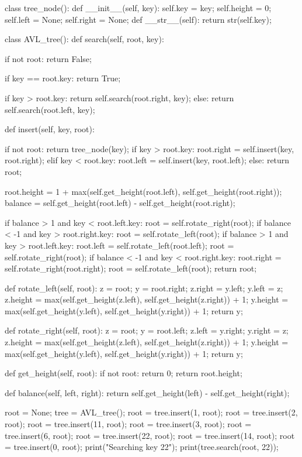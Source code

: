 \begin{python}
class tree_node():
	def __init__(self, key):
		self.key = key;
		self.height = 0;
		self.left = None;
		self.right = None;
	def __str__(self):
		return str(self.key);

class AVL_tree():
	def search(self, root, key):
		

		if not root:
			return False;

		if key == root.key:
			return True;

		if key > root.key:
			return self.search(root.right, key);
		else:
			return self.search(root.left, key);

	def insert(self, key, root):
		
		if not root:
			return tree_node(key);
		if key > root.key:
			root.right = self.insert(key, root.right);
		elif key < root.key:
			root.left = self.insert(key, root.left);
		else:
			return root;

		root.height = 1 + max(self.get_height(root.left), self.get_height(root.right));
		balance = self.get_height(root.left) - self.get_height(root.right);

		if balance > 1 and key < root.left.key:
			root = self.rotate_right(root);
		if balance < -1 and key > root.right.key:
			root = self.rotate_left(root);
		if balance > 1 and key > root.left.key:
			root.left = self.rotate_left(root.left);
			root = self.rotate_right(root);
		if balance < -1 and key < root.right.key:
			root.right = self.rotate_right(root.right);
			root = self.rotate_left(root);
		return root;

	def rotate_left(self, root):
		z = root;
		y = root.right;		
		z.right = y.left;
		y.left = z;
		z.height = max(self.get_height(z.left), self.get_height(z.right)) + 1;
		y.height = max(self.get_height(y.left), self.get_height(y.right)) + 1;
		return y;

	def rotate_right(self, root):
		z = root;
		y = root.left;		
		z.left = y.right;
		y.right = z;
		z.height = max(self.get_height(z.left), self.get_height(z.right)) + 1;
		y.height = max(self.get_height(y.left), self.get_height(y.right)) + 1;
		return y;

	def get_height(self, root):
		if not root:
			return 0;
		return root.height;

	def balance(self, left, right):
		return self.get_height(left) - self.get_height(right);

root = None;
tree = AVL_tree();
root = tree.insert(1, root);
root = tree.insert(2, root);
root = tree.insert(11, root);
root = tree.insert(3, root);
root = tree.insert(6, root);
root = tree.insert(22, root);
root = tree.insert(14, root);
root = tree.insert(0, root);
print("Searching key 22");
print(tree.search(root, 22));
\end{python}

